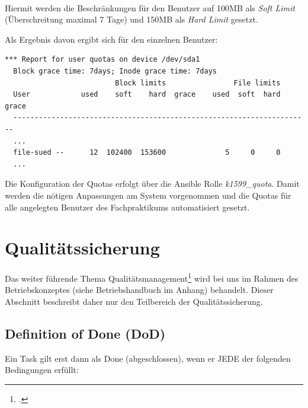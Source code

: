 \\

Hiermit werden die Beschränkungen für den Benutzer  auf 100MB
als \textit{Soft Limit} (Überschreitung maximal 7 Tage) und 150MB als
\textit{Hard Limit} gesetzt.

Als Ergebnis davon ergibt sich für den einzelnen Benutzer:\\

\begin{lstlisting}[label=code:quota2,caption=repquota]
  *** Report for user quotas on device /dev/sda1
  Block grace time: 7days; Inode grace time: 7days
                          Block limits                File limits
  User            used    soft    hard  grace    used  soft  hard  grace
  ----------------------------------------------------------------------
  ...
  file-sued --      12  102400  153600              5     0     0
  ...
\end{lstlisting}

Die Konfiguration der Quotas erfolgt über die Ansible Rolle
\textit{k1599\_quota}. Damit werden die nötigen Anpassungen am System
vorgenommen und die Quotas für alle angelegten Benutzer des Fachpraktikums
automatisiert gesetzt.


\section{Qualitätssicherung}
\label{sec:qs}
Das weiter führende Thema Qualitätsmanagement\footcite{wikiQualityM} wird bei uns im Rahmen des Betriebskonzeptes (siehe Betriebshandbuch im Anhang) behandelt. Dieser Abschnitt beschreibt daher nur den Teilbereich der Qualitätssicherung.

\subsection{Definition of Done (DoD)}
\label{subsec:dod}
Ein Task gilt erst dann als Done (abgeschlossen), wenn er JEDE der folgenden Bedingungen erfüllt:

